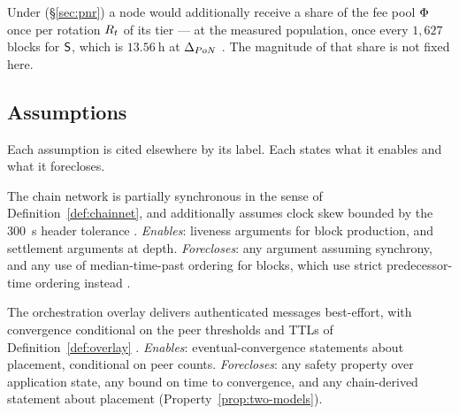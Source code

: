 \begin{remark}
\label{rem:pool-share}
\planned Under \PNR{} (\S\ref{sec:pnr}) a node would additionally receive a share of the fee pool
$\Phi$ once per rotation $R_{t}$ of its tier --- at the measured population, once every $1{,}627$
blocks for $\mathsf{S}$, which is $\qty{13.56}{\hour}$ at $\Delta_{PoN}$
. The magnitude of that share is not
fixed here.
\end{remark}

\subsection{Assumptions}
\label{sec:model:assumptions}

Each assumption is cited elsewhere by its label. Each states what it enables and what it forecloses.

\begin{assumption}
\label{asm:a1-synchrony}
\shipped The chain network is partially synchronous in the sense of Definition~\ref{def:chainnet},
and \PoN{} additionally assumes clock skew bounded by the \qty{300}{\second} header tolerance
.
\emph{Enables}: liveness arguments for block production, and settlement arguments at depth.
\emph{Forecloses}: any argument assuming synchrony, and any use of median-time-past ordering for
\PoN{} blocks, which use strict predecessor-time ordering instead
.
\end{assumption}

\begin{assumption}
\label{asm:a2-overlay}
\shipped The orchestration overlay delivers authenticated messages best-effort, with convergence
conditional on the peer thresholds and TTLs of Definition~\ref{def:overlay}
.
\emph{Enables}: eventual-convergence statements about placement, conditional on peer counts.
\emph{Forecloses}: any safety property over application state, any bound on time to convergence, and
any chain-derived statement about placement (Property~\ref{prop:two-models}).
\end{assumption}

